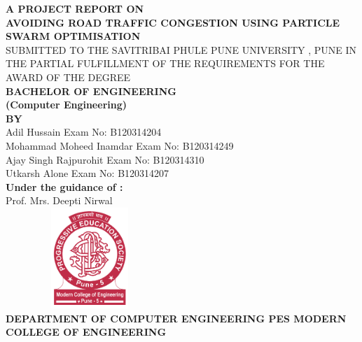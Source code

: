 \documentclass[twoside,a4paper,12pt]{book}
\begin{document}
\pagestyle{empty}


\setlength{\parindent}{0mm}
\begin{center}

{\bfseries A  PROJECT REPORT ON \\}
 \vspace*{2\baselineskip}
{\bfseries \fontsize{16}{16} \selectfont AVOIDING ROAD TRAFFIC CONGESTION USING PARTICLE SWARM OPTIMISATION \\ \vspace*{2\baselineskip}}
{\fontsize{12}{12} \selectfont SUBMITTED TO THE SAVITRIBAI PHULE PUNE UNIVERSITY , PUNE
IN THE PARTIAL FULFILLMENT OF THE REQUIREMENTS 
FOR THE AWARD OF THE DEGREE
\\

\vspace*{2\baselineskip}}
{\bfseries \fontsize{14}{12} \selectfont BACHELOR OF ENGINEERING\\
 (Computer Engineering) \\
\vspace*{1\baselineskip}} 
{\bfseries \fontsize{14}{12} \selectfont BY \\ 
\vspace*{1\baselineskip}} 
\hspace*{15mm}Adil Hussain \hfill Exam No: B120314204\hspace*{15mm} \\
\hspace*{15mm}Mohammad Moheed Inamdar \hfill Exam No: B120314249\hspace*{15mm}  \\
\hspace*{15mm}Ajay Singh Rajpurohit \hfill Exam No: B120314310\hspace*{15mm} \\
\hspace*{15mm}Utkarsh Alone \hfill Exam No: B120314207\hspace*{15mm} \\
\vspace*{2\baselineskip}
{\bfseries \fontsize{14}{12} \selectfont Under the guidance of : \\}
Prof. Mrs. Deepti Nirwal\\
\includegraphics[height=1.5in, width=2.5in,keepaspectratio]{collegelogo.png}\\[6mm]
\fontsize{14}{5pt}\selectfont
\textbf{DEPARTMENT OF COMPUTER ENGINEERING\vspace*{1\baselineskip}
 PES MODERN COLLEGE OF ENGINEERING}\\


\end{center}
\end{document}
